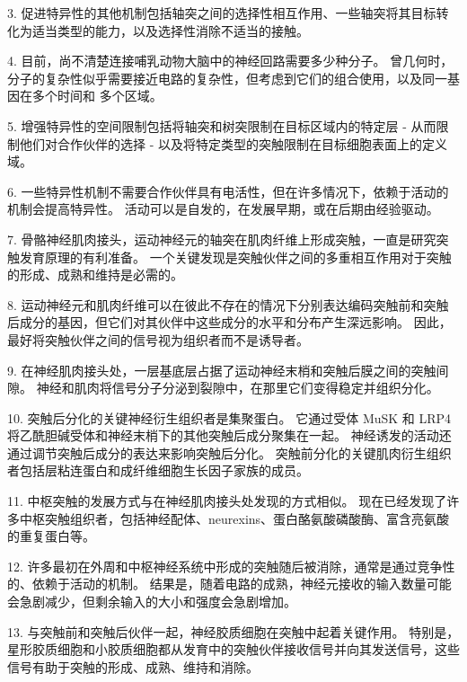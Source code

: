 3. 促进特异性的其他机制包括轴突之间的选择性相互作用、一些轴突将其目标转化为适当类型的能力，以及选择性消除不适当的接触。 

4. 目前，尚不清楚连接哺乳动物大脑中的神经回路需要多少种分子。 曾几何时，分子的复杂性似乎需要接近电路的复杂性，但考虑到它们的组合使用，以及同一基因在多个时间和 多个区域。

5. 增强特异性的空间限制包括将轴突和树突限制在目标区域内的特定层 - 从而限制他们对合作伙伴的选择 - 以及将特定类型的突触限制在目标细胞表面上的定义域。 

6. 一些特异性机制不需要合作伙伴具有电活性，但在许多情况下，依赖于活动的机制会提高特异性。 活动可以是自发的，在发展早期，或在后期由经验驱动。 

7. 骨骼神经肌肉接头，运动神经元的轴突在肌肉纤维上形成突触，一直是研究突触发育原理的有利准备。 一个关键发现是突触伙伴之间的多重相互作用对于突触的形成、成熟和维持是必需的。 

8. 运动神经元和肌肉纤维可以在彼此不存在的情况下分别表达编码突触前和突触后成分的基因，但它们对其伙伴中这些成分的水平和分布产生深远影响。 因此，最好将突触伙伴之间的信号视为组织者而不是诱导者。 

9. 在神经肌肉接头处，一层基底层占据了运动神经末梢和突触后膜之间的突触间隙。 神经和肌肉将信号分子分泌到裂隙中，在那里它们变得稳定并组织分化。 

10. 突触后分化的关键神经衍生组织者是集聚蛋白。 它通过受体 MuSK 和 LRP4 将乙酰胆碱受体和神经末梢下的其他突触后成分聚集在一起。 神经诱发的活动还通过调节突触后成分的表达来影响突触后分化。 突触前分化的关键肌肉衍生组织者包括层粘连蛋白和成纤维细胞生长因子家族的成员。 

11. 中枢突触的发展方式与在神经肌肉接头处发现的方式相似。 现在已经发现了许多中枢突触组织者，包括神经配体、neurexins、蛋白酪氨酸磷酸酶、富含亮氨酸的重复蛋白等。 

12. 许多最初在外周和中枢神经系统中形成的突触随后被消除，通常是通过竞争性的、依赖于活动的机制。 结果是，随着电路的成熟，神经元接收的输入数量可能会急剧减少，但剩余输入的大小和强度会急剧增加。 

13. 与突触前和突触后伙伴一起，神经胶质细胞在突触中起着关键作用。 特别是，星形胶质细胞和小胶质细胞都从发育中的突触伙伴接收信号并向其发送信号，这些信号有助于突触的形成、成熟、维持和消除。


